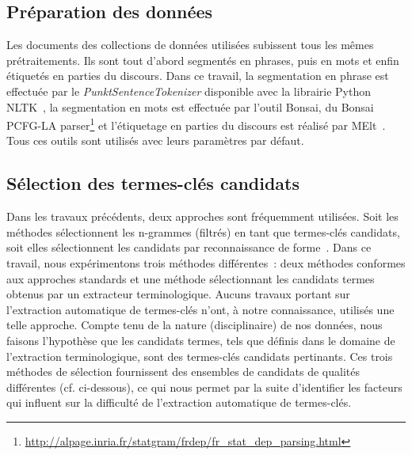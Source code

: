   \subsection{Préparation des données}
  \label{subsec:preparation_des_donnees}
    Les documents des collections de données utilisées subissent tous les mêmes
    prétraitements. Ils sont tout d'abord segmentés en phrases, puis en mots et
    enfin étiquetés en parties du discours. Dans ce travail, la segmentation en
    phrase est effectuée par le \textit{PunktSentenceTokenizer} disponible avec
    la librairie Python NLTK~\cite[\textit{Natural Language
    ToolKit}]{bird2009nltk}, la segmentation en mots est effectuée par l'outil
    Bonsai, du Bonsai PCFG-LA
    parser\footnote{\url{http://alpage.inria.fr/statgram/frdep/fr_stat_dep_parsing.html}}
    et l'étiquetage en parties du discours est réalisé par
    MElt~\cite{denis2009melt}. Tous ces outils sont utilisés avec leurs
    paramètres par défaut.

  \subsection{Sélection des termes-clés candidats}
  \label{subsec:extraction_de_termes_cles_candidats}
    Dans les travaux précédents, deux approches sont fréquemment utilisées. Soit
    les méthodes sélectionnent les n-grammes (filtrés) en tant que termes-clés
    candidats, soit elles sélectionnent les candidats par reconnaissance de
    forme~\cite{hulth2003keywordextraction}. Dans ce travail, nous expérimentons
    trois méthodes différentes~: deux méthodes conformes aux approches standards
    et une méthode sélectionnant les candidats termes obtenus par un extracteur
    terminologique. Aucuns travaux portant sur l'extraction automatique de
    termes-clés n'ont, à notre connaissance, utilisés une telle approche. Compte
    tenu de la nature (disciplinaire) de nos données, nous faisons l'hypothèse
    que les candidats termes, tels que définis dans le domaine de l'extraction
    terminologique, sont des termes-clés candidats pertinants. Ces trois
    méthodes de sélection fournissent des ensembles de candidats de qualités
    différentes (cf. ci-dessous), ce qui nous permet par la suite d'identifier
    les facteurs qui influent sur la difficulté de l'extraction automatique de
    termes-clés.


